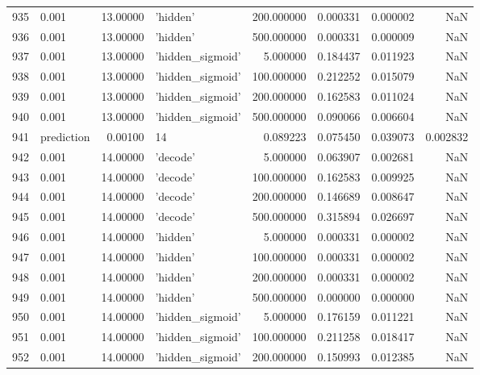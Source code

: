 \documentclass[10pt,a4paper]{article}
\begin{document}
\begin{tabular}{llrlrrrr}
935  &       0.001 &  13.00000 &           'hidden' &  200.000000 &  0.000331 &  0.000002 &       NaN \\
936  &       0.001 &  13.00000 &           'hidden' &  500.000000 &  0.000331 &  0.000009 &       NaN \\
937  &       0.001 &  13.00000 &   'hidden\_sigmoid' &    5.000000 &  0.184437 &  0.011923 &       NaN \\
938  &       0.001 &  13.00000 &   'hidden\_sigmoid' &  100.000000 &  0.212252 &  0.015079 &       NaN \\
939  &       0.001 &  13.00000 &   'hidden\_sigmoid' &  200.000000 &  0.162583 &  0.011024 &       NaN \\
940  &       0.001 &  13.00000 &   'hidden\_sigmoid' &  500.000000 &  0.090066 &  0.006604 &       NaN \\
941  &  prediction &   0.00100 &                 14 &    0.089223 &  0.075450 &  0.039073 &  0.002832 \\
942  &       0.001 &  14.00000 &           'decode' &    5.000000 &  0.063907 &  0.002681 &       NaN \\
943  &       0.001 &  14.00000 &           'decode' &  100.000000 &  0.162583 &  0.009925 &       NaN \\
944  &       0.001 &  14.00000 &           'decode' &  200.000000 &  0.146689 &  0.008647 &       NaN \\
945  &       0.001 &  14.00000 &           'decode' &  500.000000 &  0.315894 &  0.026697 &       NaN \\
946  &       0.001 &  14.00000 &           'hidden' &    5.000000 &  0.000331 &  0.000002 &       NaN \\
947  &       0.001 &  14.00000 &           'hidden' &  100.000000 &  0.000331 &  0.000002 &       NaN \\
948  &       0.001 &  14.00000 &           'hidden' &  200.000000 &  0.000331 &  0.000002 &       NaN \\
949  &       0.001 &  14.00000 &           'hidden' &  500.000000 &  0.000000 &  0.000000 &       NaN \\
950  &       0.001 &  14.00000 &   'hidden\_sigmoid' &    5.000000 &  0.176159 &  0.011221 &       NaN \\
951  &       0.001 &  14.00000 &   'hidden\_sigmoid' &  100.000000 &  0.211258 &  0.018417 &       NaN \\
952  &       0.001 &  14.00000 &   'hidden\_sigmoid' &  200.000000 &  0.150993 &  0.012385 &       NaN \\

\end{tabular}
\end{document}
